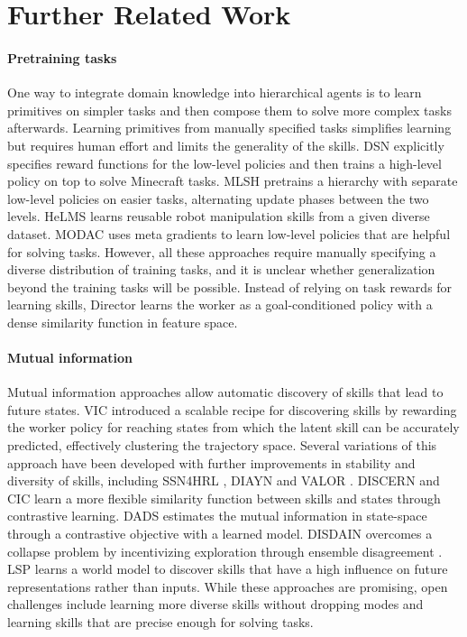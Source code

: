 \section{Further Related Work}
\label{sec:morerelated}

\paragraph{Pretraining tasks}

One way to integrate domain knowledge into hierarchical agents is to learn primitives on simpler tasks and then compose them to solve more complex tasks afterwards. 
Learning primitives from manually specified tasks simplifies learning but requires human effort and limits the generality of the skills. 
DSN \citep{tessler2017dsn} explicitly specifies reward functions for the low-level policies and then trains a high-level policy on top to solve Minecraft tasks. 
MLSH \citep{frans2017mlsh} pretrains a hierarchy with separate low-level policies on easier tasks, alternating update phases between the two levels. 
HeLMS \citep{rao2021helms} learns reusable robot manipulation skills from a given diverse dataset. 
MODAC \citep{veeriah2021modac} uses meta gradients to learn low-level policies that are helpful for solving tasks. 
However, all these approaches require manually specifying a diverse distribution of training tasks, and it is unclear whether generalization beyond the training tasks will be possible. 
Instead of relying on task rewards for learning skills, Director learns the worker as a goal-conditioned policy with a dense similarity function in feature space.

\paragraph{Mutual information}

Mutual information approaches allow automatic discovery of skills that lead to future states. 
VIC \citep{gregor2016vic} introduced a scalable recipe for discovering skills by rewarding the worker policy for reaching states from which the latent skill can be accurately predicted, effectively clustering the trajectory space. 
Several variations of this approach have been developed with further improvements in stability and diversity of skills, including SSN4HRL \citep{florensa2017snn}, DIAYN \citep{eysenbach2018diayn} and VALOR \citep{achiam2018valor}. 
DISCERN \citep{warde2018discern} and CIC \citep{laskin2022cic} learn a more flexible similarity function between skills and states through contrastive learning. 
DADS \citep{sharma2019dads} estimates the mutual information in state-space through a contrastive objective with a learned model. 
DISDAIN overcomes a collapse problem by incentivizing exploration through ensemble disagreement \citep{strouse2021disdain}. 
LSP \citep{xie2020lsp} learns a world model to discover skills that have a high influence on future representations rather than inputs. 
While these approaches are promising, open challenges include learning more diverse skills without dropping modes and learning skills that are precise enough for solving tasks.

